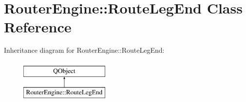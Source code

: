 \hypertarget{classRouterEngine_1_1RouteLegEnd}{}\section{Router\+Engine\+:\+:Route\+Leg\+End Class Reference}
\label{classRouterEngine_1_1RouteLegEnd}
Inheritance diagram for Router\+Engine\+:\+:Route\+Leg\+End\+:\begin{figure}[H]
\begin{center}
\leavevmode
\includegraphics[height=2.000000cm]{classRouterEngine_1_1RouteLegEnd}
\end{center}
\end{figure}
